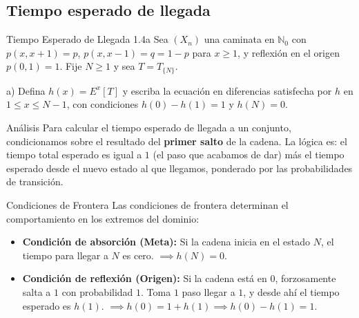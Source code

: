 \documentclass[10pt,a4paper]{article}
\begin{document}
\newpage

\subsection{Tiempo esperado de llegada}

\vspace{5mm}

\begin{ejercicio}{Tiempo Esperado de Llegada }{1.4a}
    Sea $(X_n)$ una caminata en $\mathbb{N}_0$ con $p(x, x+1) = p$, $p(x, x-1) = q = 1-p$ para $x \ge 1$, y reflexión en el origen $p(0,1) = 1$. Fije $N \ge 1$ y sea $T = T_{\{N\}}$.
\end{ejercicio}

a) Defina $h(x) = E^x[T]$ y escriba la ecuación en diferencias satisfecha por $h$ en $1 \le x \le N-1$, con condiciones $h(0) - h(1) = 1$ y $h(N) = 0$.
\vspace{2mm}

\begin{nota}{Análisis}
    Para calcular el tiempo esperado de llegada a un conjunto, condicionamos sobre el resultado del \textbf{primer salto} de la cadena. 
    La lógica es: el tiempo total esperado es igual a $1$ (el paso que acabamos de dar) más el tiempo esperado desde el nuevo estado al que llegamos, ponderado por las probabilidades de transición.
\end{nota}

\begin{alerta}{Condiciones de Frontera}
    Las condiciones de frontera determinan el comportamiento en los extremos del dominio:
    \begin{itemize}
        \item \textbf{Condición de absorción (Meta):} Si la cadena inicia en el estado $N$, el tiempo para llegar a $N$ es cero. $\implies h(N) = 0$.
        \item \textbf{Condición de reflexión (Origen):} Si la cadena está en $0$, forzosamente salta a $1$ con probabilidad $1$. Toma $1$ paso llegar a $1$, y desde ahí el tiempo esperado es $h(1)$. $\implies h(0) = 1 + h(1) \implies h(0) - h(1) = 1$.
    \end{itemize}
\end{alerta}

\vspace{5mm}
\end{document}
